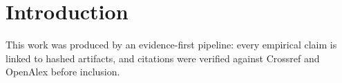 \section{Introduction}
\label{sec:introduction}
This work was produced by an evidence-first pipeline: every empirical claim is linked to hashed artifacts, and citations were verified against Crossref and OpenAlex before inclusion.
